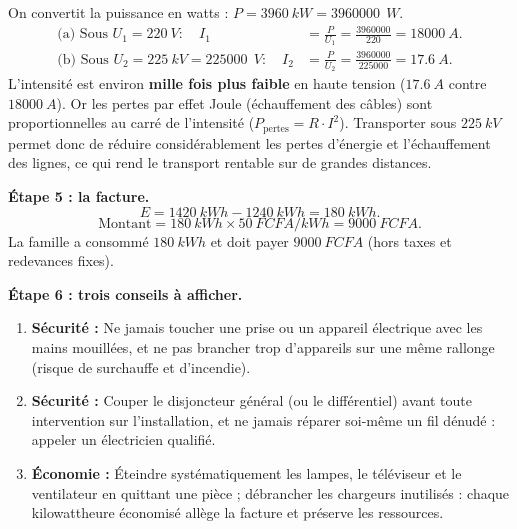 \documentclass[11pt]{article}
\begin{document}
\begin{exoresolu}
On convertit la puissance en watts : $P = \SI{3960}{kW} = \num{3960000}\ \SI{}{W}$.
\begin{align*}
\text{(a) Sous } U_1 = \SI{220}{V} : \quad I_1 &= \frac{P}{U_1} = \frac{\num{3960000}}{220} = \SI{18000}{A}.\\
\text{(b) Sous } U_2 = \SI{225}{kV} = \num{225000}\ \SI{}{V} : \quad I_2 &= \frac{P}{U_2} = \frac{\num{3960000}}{\num{225000}} = \SI{17,6}{A}.
\end{align*}
L'intensité est environ \textbf{mille fois plus faible} en haute tension ($\SI{17,6}{A}$ contre $\SI{18000}{A}$). Or les pertes par effet Joule (échauffement des câbles) sont proportionnelles au carré de l'intensité ($P_{\text{pertes}} = R \cdot I^2$). Transporter sous $\SI{225}{kV}$ permet donc de réduire considérablement les pertes d'énergie et l'échauffement des lignes, ce qui rend le transport rentable sur de grandes distances.

\textbf{Étape 5 : la facture.}
\[
E = \SI{1420}{kWh} - \SI{1240}{kWh} = \SI{180}{kWh}.
\]
\[
\text{Montant} = \SI{180}{kWh} \times \SI{50}{FCFA/kWh} = \SI{9000}{FCFA}.
\]
La famille a consommé $\SI{180}{kWh}$ et doit payer $\SI{9000}{FCFA}$ (hors taxes et redevances fixes).

\textbf{Étape 6 : trois conseils à afficher.}
\begin{enumerate}
\item \textbf{Sécurité :} Ne jamais toucher une prise ou un appareil électrique avec les mains mouillées, et ne pas brancher trop d'appareils sur une même rallonge (risque de surchauffe et d'incendie).
\item \textbf{Sécurité :} Couper le disjoncteur général (ou le différentiel) avant toute intervention sur l'installation, et ne jamais réparer soi-même un fil dénudé : appeler un électricien qualifié.
\item \textbf{Économie :} Éteindre systématiquement les lampes, le téléviseur et le ventilateur en quittant une pièce ; débrancher les chargeurs inutilisés : chaque kilowattheure économisé allège la facture et préserve les ressources.
\end{enumerate}
\end{exoresolu}
\end{document}

